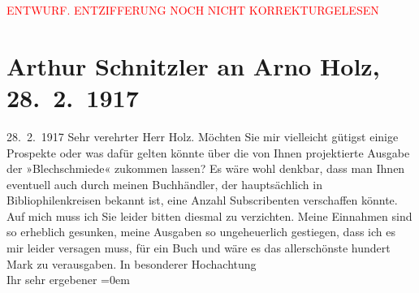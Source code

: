 
\begin{center}
            \textcolor{red}{ENTWURF. ENTZIFFERUNG NOCH NICHT KORREKTURGELESEN}
                      \end{center}
            
               \section[Arthur Schnitzler an Arno Holz, 28. 2. 1917]{ Arthur Schnitzler an Arno Holz, 28. 2. 1917}\nopagebreak{}\rehead{ }\begin{ledgroupsized}[t]{13cm}\normalsize\beginnumbering{} \toendnotes[C]{\smallbreak\pagebreak[2]} 
\toendnotes[C]{\smallbreak}\pstart
           \raggedleft{}{\pb}28. 2. 1917\pend
           \pstart\center{}Sehr verehrter Herr Holz.\pend\pstart
           Möchten Sie mir vielleicht gütigst einige Prospekte oder was dafür gelten könnte
                    über die von Ihnen projektierte Ausgabe der »Blechschmiede« zukommen lassen? Es wäre wohl denkbar, dass man Ihnen
                    eventuell auch durch meinen Buchhändler, der hauptsächlich in Bibliophilenkreisen bekannt ist,
                    eine Anzahl Subscribenten verschaffen könnte. Auf mich muss ich Sie leider
                    bitten diesmal zu verzichten. Meine Einnahmen sind so erheblich gesunken, meine
                    Ausgaben so ungeheuerlich gestiegen, dass \introOben{}ich\introOben{} es mir
                    leider versagen muss, für ein Buch und wäre es das allerschönste hundert Mark zu
                    verausgaben.\pend
           \pstart
           In besonderer Hochachtung{\\[\baselineskip]} Ihr sehr ergebener\pend
           \leftskip=0em{}\endnumbering{}\end{ledgroupsized}  \newcommand{\dateiname}{L02258}\newcommand{\titel}{Arthur Schnitzler an Arno Holz, 28. 2. 1917}\newcommand{\editorInnen}{Martin Anton Müller und Gerd-Hermann Susen}
      